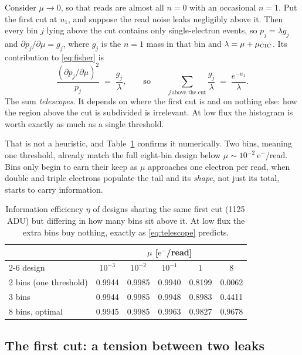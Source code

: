 \documentclass[11pt,a4paper]{article}
\newcommand{\ADU}{\ensuremath{\mathrm{ADU}}}
\newcommand{\eminus}{\ensuremath{\mathrm{e}^-}}
\begin{document}
Consider $\mu \to 0$, so that reads are almost all $n=0$ with an occasional
$n=1$. Put the first cut at $u_1$, and suppose the read noise leaks negligibly
above it. Then every bin $j$ lying above the cut contains only single-electron
events, so $p_j = \lambda g_j$ and $\partial p_j/\partial\mu = g_j$, where
$g_j$ is the $n=1$ mass in that bin and $\lambda = \mu + \mu_{\rm CIC}$. Its
contribution to \eqref{eq:fisher} is
\begin{equation}
  \frac{(\partial p_j/\partial\mu)^2}{p_j} \;=\; \frac{g_j}{\lambda},
  \qquad\text{so}\qquad
  \sum_{j \,\text{above the cut}} \frac{g_j}{\lambda}
  \;=\; \frac{e^{-u_1}}{\lambda}.
  \label{eq:telescope}
\end{equation}
The sum \emph{telescopes}. It depends on where the first cut is and on nothing
else: how the region above the cut is subdivided is irrelevant. At low flux the
histogram is worth exactly as much as a single threshold.

That is not a heuristic, and Table~\ref{tab:telescope} confirms it numerically.
Two bins, meaning one threshold, already match the full eight-bin design below
$\mu \sim 10^{-2}\ \eminus$/read. Bins only begin to earn their keep as $\mu$
approaches one electron per read, when double and triple electrons populate the
tail and its \emph{shape}, not just its total, starts to carry information.

\begin{table}[h]
\centering
\small
\caption{Information efficiency $\eta$ of designs sharing the same first cut
(1125\,\ADU) but differing in how many bins sit above it. At low flux the extra
bins buy nothing, exactly as \eqref{eq:telescope} predicts.}
\label{tab:telescope}
\begin{tabular}{lccccc}
\toprule
& \multicolumn{5}{c}{$\mu$ [\eminus/read]}\\
\cmidrule(l){2-6}
design & $10^{-3}$ & $10^{-2}$ & $10^{-1}$ & $1$ & $8$\\
\midrule
2 bins (one threshold) & 0.9944 & 0.9985 & 0.9940 & 0.8199 & 0.0062\\
3 bins                 & 0.9944 & 0.9985 & 0.9948 & 0.8983 & 0.4411\\
8 bins, optimal        & 0.9945 & 0.9985 & 0.9963 & 0.9827 & 0.9678\\
\bottomrule
\end{tabular}
\end{table}

\subsection{The first cut: a tension between two leaks}
\label{sec:firstcut}
\end{document}
